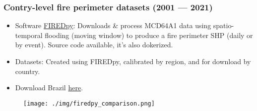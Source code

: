 \documentclass{beamer}
\begin{document}
\begin{frame}[t, allowframebreaks]
    \frametitle{Contry-level fire perimeter datasets (2001 --- 2021)
    ~\cite{mahood2022}}
    \begin{itemize}
        \item Software \href{https://github.com/earthlab/firedpy}{FIREDpy}: 
            Downloads \& process MCD64A1 data using spatio-temporal flooding 
            (moving window)  to produce a fire perimeter SHP (daily or by 
            event). Source code available, it's also dokerized.
        \item Datasets: Created using FIREDpy, calibrated by region, and for 
            download by country.
        \item Download Brazil 
           \href{https://scholar.colorado.edu/concern/datasets/05741s90}{here}.
    \end{itemize}
    \begin{figure}
        \centering
        \texttt{[image: ./img/firedpy\_comparison.png]}
    \end{figure} 
\end{frame}
\end{document}
